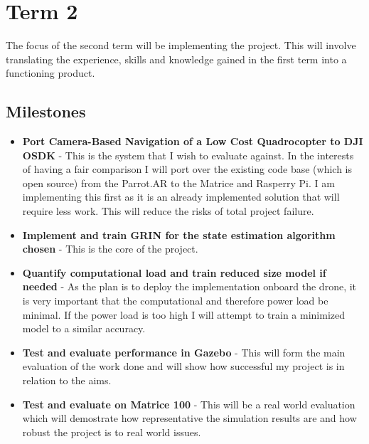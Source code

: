 \documentclass[]{final_report}
\begin{document}
\section{Term 2}

The focus of the second term will be implementing the project. This will involve translating the experience, skills and knowledge gained in the first term into a functioning product.

\subsection{Milestones}
\begin{itemize}
  \item \textbf{Port Camera-Based Navigation of a Low Cost Quadrocopter to DJI OSDK} - This is the system that I wish to evaluate against. In the interests of having a fair comparison I will port over the existing code base (which is open source) from the Parrot.AR to the Matrice and Rasperry Pi. I am implementing this first as it is an already implemented solution that will require less work. This will reduce the risks of total project failure.
  \item \textbf{Implement and train GRIN for the state estimation algorithm chosen} - This is the core of the project.
  \item \textbf{Quantify computational load and train reduced size model if needed} - As the plan is to deploy the implementation onboard the drone, it is very important that the computational and therefore power load be minimal. If the power load is too high I will attempt to train a minimized model to a similar accuracy.
  \item \textbf{Test and evaluate performance in Gazebo} - This will form the main evaluation of the work done and will show how successful my project is in relation to the aims.
  \item \textbf{Test and evaluate on Matrice 100} - This will be a real world evaluation which will demostrate how representative the simulation results are and how robust the project is to real world issues.
\end{itemize}
\end{document}
